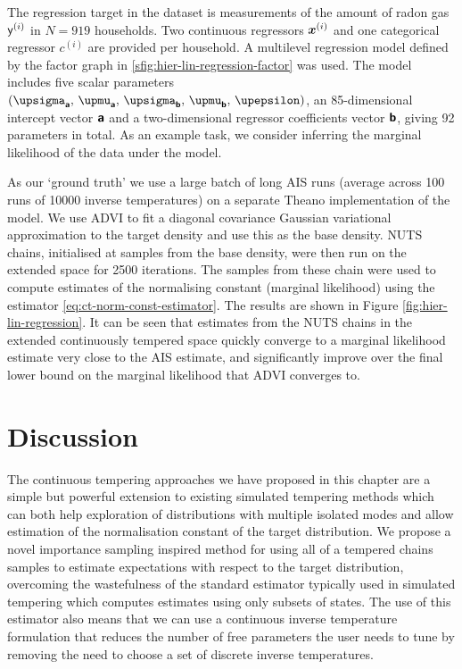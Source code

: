 The regression target in the dataset is measurements of the amount of radon gas $\mathsf{y}^{(i)}$ in $N=919$ households. Two continuous regressors $\boldsymbol{x}^{(i)}$ and one categorical regressor $c^{(i)}$ are provided per household. A multilevel regression model defined by the factor graph in \ref{sfig:hier-lin-regression-factor} was used. The model includes five scalar parameters $(\upsigma_{\rvct{a}},\,\upmu_{\rvct{a}},\,\upsigma_{\rvct{b}},\,\upmu_{\rvct{b}},\,\upepsilon)$, an 85-dimensional intercept vector $\boldsymbol{\mathsf{a}}$ and a two-dimensional regressor coefficients vector $\boldsymbol{\mathsf{b}}$, giving 92 parameters in total. As an example task, we consider inferring the marginal likelihood of the data under the model. %

As our `ground truth' we use a large batch of long \ac{AIS} runs (average across 100 runs of 10000 inverse temperatures) on a separate Theano implementation of the model. We use \ac{ADVI} to fit a diagonal covariance Gaussian variational approximation to the target density and use this as the base density. \ac{NUTS} chains, initialised at samples from the base density, were then run on the extended space for 2500 iterations. The samples from these chain were used to compute estimates of the normalising constant (marginal likelihood) using the estimator \eqref{eq:ct-norm-const-estimator}. The results are shown in Figure \ref{fig:hier-lin-regression}. It can be seen that estimates from the \ac{NUTS} chains in the extended continuously tempered space quickly converge to a marginal likelihood estimate very close to the \ac{AIS} estimate, and significantly improve over the final lower bound on the marginal likelihood that \ac{ADVI} converges to.

\section{Discussion}

The continuous tempering approaches we have proposed in this chapter are a simple but powerful extension to existing simulated tempering methods which can both help exploration of distributions with multiple isolated modes and allow estimation of the normalisation constant of the target distribution. We propose a novel importance sampling inspired method for using all of a tempered chains samples to estimate expectations with respect to the target distribution, overcoming the wastefulness of the standard estimator typically used in simulated tempering which computes estimates using only subsets of states. The use of this estimator also means that we can use a continuous inverse temperature formulation that reduces the number of free parameters the user needs to tune by removing the need to choose a set of discrete inverse temperatures.


